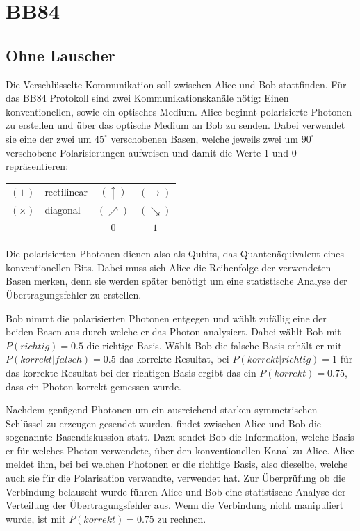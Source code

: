 \section{BB84}

  \subsection{Ohne Lauscher}
  Die Verschl\"usselte Kommunikation soll zwischen Alice und Bob stattfinden.
  F\"ur das BB84 Protokoll sind zwei Kommunikationskan\"ale n\"otig:
  Einen konventionellen, sowie ein optisches Medium.
  Alice beginnt polarisierte Photonen zu erstellen und \"uber das optische Medium an Bob zu senden.
  Dabei verwendet sie eine der zwei um $45^{\circ}$ verschobenen Basen,
  welche jeweils zwei um $90^{\circ}$ verschobene Polarisierungen aufweisen und damit die Werte 1 und 0 repr\"asentieren:

  \begin{tabular}{l l || c c}
    $(+)$ & rectilinear & $(\uparrow)$ & $(\rightarrow)$\\
    $(\times)$ & diagonal & $(\nearrow)$ & $(\searrow)$\\
    \hline
    & & $0$ & $1$\\
  \end{tabular}

  Die polarisierten Photonen dienen also als Qubits, das Quanten\"aquivalent eines konventionellen Bits.
  Dabei muss sich Alice die Reihenfolge der verwendeten Basen merken,
  denn sie werden sp\"ater ben\"otigt um eine statistische Analyse der \"Ubertragungsfehler zu erstellen.

  Bob nimmt die polarisierten Photonen entgegen und w\"ahlt zuf\"allig eine der beiden Basen aus durch welche er das Photon analysiert.
  Dabei w\"ahlt Bob mit $P(richtig)=0.5$ die richtige Basis.
  W\"ahlt Bob die falsche Basis erh\"alt er mit $P(korrekt|falsch)=0.5$ das korrekte Resultat,
  bei $P(korrekt|richtig)=1$ f\"ur das korrekte Resultat bei der richtigen Basis ergibt das ein $P(korrekt)=0.75$,
  dass ein Photon korrekt gemessen wurde.

  Nachdem gen\"ugend Photonen um ein ausreichend starken symmetrischen Schl\"ussel zu erzeugen gesendet wurden, findet zwischen Alice und Bob die sogenannte Basendiskussion statt.
  Dazu sendet Bob die Information, welche Basis er f\"ur welches Photon verwendete, \"uber den konventionellen Kanal zu Alice.
  Alice meldet ihm, bei bei welchen Photonen er die richtige Basis, also dieselbe, welche auch sie f\"ur die Polarisation verwandte, verwendet hat.
  Zur \"Uberpr\"ufung ob die Verbindung belauscht wurde f\"uhren Alice und Bob eine statistische Analyse der Verteilung der \"Ubertragungsfehler aus.
  Wenn die Verbindung nicht manipuliert wurde, ist mit $P(korrekt)=0.75$ zu rechnen.

